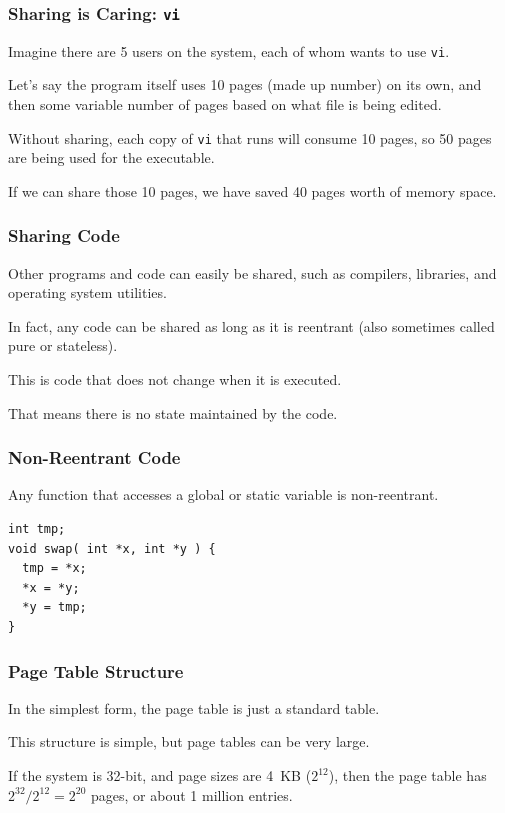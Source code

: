 \begin{frame}
\frametitle{Sharing is Caring: \texttt{vi}}

Imagine there are 5 users on the system, each of whom wants to use \texttt{vi}. 

Let's say the program itself uses 10 pages (made up number) on its own, and then some variable number of pages based on what file is being edited. 

Without sharing, each copy of \texttt{vi} that runs will consume 10 pages, so 50 pages are being used for the executable. 

If we can share those 10 pages, we have saved 40 pages worth of memory space.


\end{frame}

\begin{frame}
\frametitle{Sharing Code}

Other programs and code can easily be shared, such as compilers, libraries, and operating system utilities. 

In fact, any code can be shared as long as it is \alert{reentrant} (also sometimes called pure or stateless). 

This is code that does not change when it is executed. 

That means there is no state maintained by the code. 


\end{frame}

\begin{frame}[fragile]
\frametitle{Non-Reentrant Code}

Any function that accesses a global or static variable is non-reentrant.

\begin{verbatim}
int tmp;
void swap( int *x, int *y ) {
  tmp = *x;
  *x = *y;
  *y = tmp; 
}
\end{verbatim}

\end{frame}

\begin{frame}
\frametitle{Page Table Structure}

In the simplest form, the page table is just a standard table. 

This structure is simple, but page tables can be very large.

If the system is 32-bit, and page sizes are 4~KB ($2^{12}$), then the page table has $2^{32}/2^{12} = 2^{20}$ pages, or about 1 million entries.

\end{frame}

